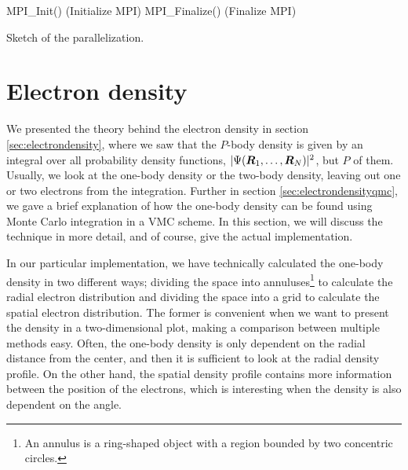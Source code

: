 \IncMargin{1em}
\begin{algorithm}
	\SetAlgoLined
	MPI\_Init() (Initialize MPI)\;
	MPI\_Finalize() (Finalize MPI)\;
	\caption{Sketch of the parallelization.}
	\label{alg:mpi}
\end{algorithm}\DecMargin{1em}

\section{Electron density} \label{sec:electrondensityimplementation}
We presented the theory behind the electron density in section \ref{sec:electrondensity}, where we saw that the $P$-body density is given by an integral over all probability density functions, $|\Psi(\boldsymbol{{R}}_1,\hdots,\boldsymbol{{R}}_N)|^2$, but $P$ of them. Usually, we look at the one-body density or the two-body density, leaving out one or two electrons from the integration. Further in section \ref{sec:electrondensityqmc}, we gave a brief explanation of how the one-body density can be found using Monte Carlo integration in a VMC scheme. In this section, we will discuss the technique in more detail, and of course, give the actual implementation.

In our particular implementation, we have technically calculated the one-body density in two different ways; dividing the space into annuluses\footnote{An annulus is a ring-shaped object with a region bounded by two concentric circles.} to calculate the radial electron distribution and dividing the space into a grid to calculate the spatial electron distribution. The former is convenient when we want to present the density in a two-dimensional plot, making a comparison between multiple methods easy. Often, the one-body density is only dependent on the radial distance from the center, and then it is sufficient to look at the radial density profile. On the other hand, the spatial density profile contains more information between the position of the electrons, which is interesting when the density is also dependent on the angle.


